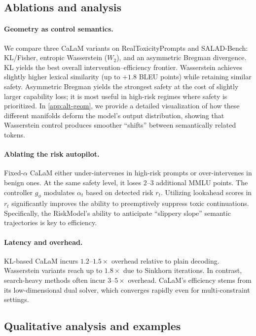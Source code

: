 \documentclass{article}
\theoremstyle{plain}
\theoremstyle{definition}
\theoremstyle{remark}
\begin{document}
\subsection{Ablations and analysis}
\label{sec:exp-ablation}

\paragraph{Geometry as control semantics.}
We compare three CaLaM variants on RealToxicityPrompts and SALAD-Bench:
KL/Fisher, entropic Wasserstein ($W_2$), and an asymmetric Bregman divergence. KL yields the best overall intervention--efficiency frontier. Wasserstein achieves slightly higher lexical similarity (up to $+1.8$ BLEU points) while retaining similar safety. Asymmetric Bregman yields the strongest safety at the cost of slightly larger capability loss; it is most useful in high-risk regimes where safety is prioritized. In \cref{app:alt-geom}, we provide a detailed visualization of how these different manifolds deform the model's output distribution, showing that Wasserstein control produces smoother ``shifts'' between semantically related tokens.

\paragraph{Ablating the risk autopilot.}
Fixed-$\alpha$ CaLaM either under-intervenes in high-risk prompts or over-intervenes in benign ones. At the same safety level, it loses $2$--$3$ additional MMLU points. The controller $g_\phi$ modulates $\alpha_t$ based on detected risk $r_t$. Utilizing lookahead scores in $r_t$ significantly improves the ability to preemptively suppress toxic continuations. Specifically, the RiskModel's ability to anticipate ``slippery slope'' semantic trajectories is key to efficiency.

\paragraph{Latency and overhead.}
KL-based CaLaM incurs $1.2$--$1.5\times$ overhead relative to plain decoding. Wasserstein variants reach up to $1.8\times$ due to Sinkhorn iterations. In contrast, search-heavy methods often incur $3$--$5\times$ overhead. CaLaM's efficiency stems from its low-dimensional dual solver, which converges rapidly even for multi-constraint settings.

\subsection{Qualitative analysis and examples}
\label{sec:qualitative}
\end{document}
